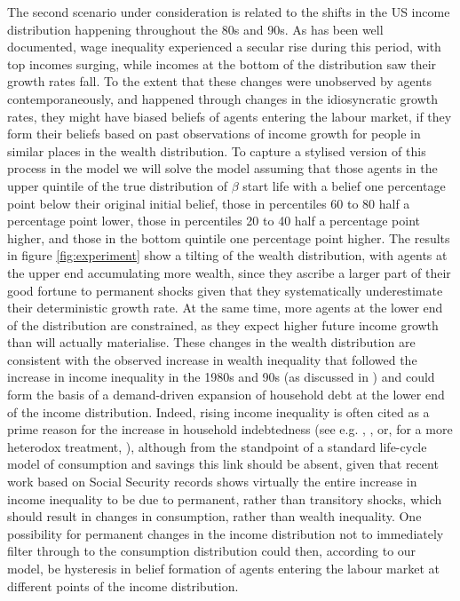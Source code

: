 The second scenario under consideration is related to the shifts in the US 
income distribution happening throughout the 80s and 90s. As has been well documented,
wage inequality experienced a secular rise during this period, with top incomes
surging, while incomes at the bottom of the distribution saw their growth rates
fall. To the extent that these changes were unobserved by agents contemporaneously,
and happened through changes in the idiosyncratic growth rates, they might have
biased beliefs of agents entering the labour market, if they form their beliefs
based on past observations of income growth for people in similar places in the 
wealth distribution. To capture a stylised version of this process in the model
we will solve the model assuming that those agents in the upper quintile of the 
true distribution of $\beta$
start life with a belief one percentage point below their original initial belief,
those in percentiles 60 to 80 half a percentage point lower, those in percentiles
20 to 40 half a percentage point higher, and those in the bottom quintile one 
percentage point higher. The results in figure \ref{fig:experiment} show 
a tilting of the wealth distribution, with agents at the upper end accumulating
more wealth, since they ascribe a larger part of their good fortune to permanent
shocks given that they systematically underestimate their deterministic growth
rate. At the same time, more agents at the lower end of the distribution are 
constrained, as they expect higher future income growth than will actually 
materialise. These changes in the wealth distribution are consistent with the
observed increase in wealth inequality that followed the increase in income 
inequality in the 1980s and 90s (as discussed in \citet{Iacoviello2008}) and 
could form the basis of a demand-driven expansion of household debt at the lower
end of the income distribution. Indeed, rising income inequality is often cited as 
a prime reason for the increase in household indebtedness (see e.g. \citet{Rajan2011},
\citet{SaezZucman2014}, or, for a more heterodox treatment, \citet{BarbaPivetti2009}),
although from the standpoint of a standard life-cycle model of consumption and 
savings this link should be absent, given that recent work based on Social 
Security records shows virtually the entire increase in income inequality to
be due to permanent, rather than transitory shocks, which should result in 
changes in consumption, rather than wealth inequality. One possibility for 
permanent changes in the income distribution not to immediately filter through
to the consumption distribution could then, according to our model, be hysteresis
in belief formation of agents entering the labour market at different points
of the income distribution.

